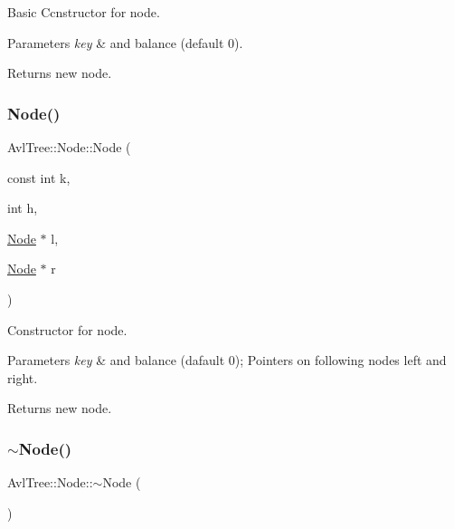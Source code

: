 Basic Ccnstructor for node. 
\begin{DoxyParams}{Parameters}
{\em key} & and balance (default 0). \\
\hline
\end{DoxyParams}
\begin{DoxyReturn}{Returns}
new node. 
\end{DoxyReturn}
\mbox{\label{struct_avl_tree_1_1_node_a5cecfa155288f9a123fe60206730bbce}} 
\subsubsection{\texorpdfstring{Node()}{Node()}\hspace{0.1cm}{\footnotesize\ttfamily [2/2]}}
{\footnotesize\ttfamily Avl\+Tree\+::\+Node\+::\+Node (\begin{DoxyParamCaption}\item[{const int}]{k,  }\item[{int}]{h,  }\item[{\mbox{\hyperlink{struct_avl_tree_1_1_node}{Node}} $\ast$}]{l,  }\item[{\mbox{\hyperlink{struct_avl_tree_1_1_node}{Node}} $\ast$}]{r }\end{DoxyParamCaption})}

Constructor for node. 
\begin{DoxyParams}{Parameters}
{\em key} & and balance (dafault 0); Pointers on following nodes left and right. \\
\hline
\end{DoxyParams}
\begin{DoxyReturn}{Returns}
new node. 
\end{DoxyReturn}
\mbox{\label{struct_avl_tree_1_1_node_a772d991375b38b592da8a22f82ac343f}} 
\subsubsection{\texorpdfstring{$\sim$\+Node()}{~Node()}}
{\footnotesize\ttfamily Avl\+Tree\+::\+Node\+::$\sim$\+Node (\begin{DoxyParamCaption}{ }\end{DoxyParamCaption})}

